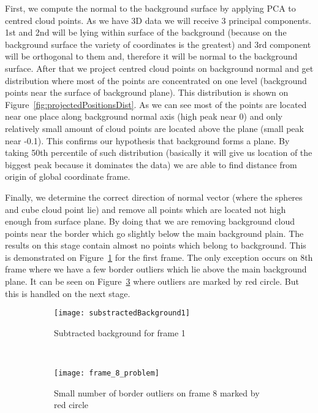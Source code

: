 \documentclass[a4paper,11pt]{article}
\theoremstyle{mytheor}
\begin{document}
First, we compute the normal to the background surface by applying PCA to centred cloud points. As we have 3D data we will receive 3 principal components. 1st and 2nd will be lying within surface of the background (because on the background surface the variety of coordinates is the greatest) and 3rd component will be orthogonal to them and, therefore it will be normal to the background surface. After that we project centred cloud points on background normal and get distribution where most of the points are concentrated on one level (background points near the surface of background plane). This distribution is shown on Figure~\ref{fig:projectedPositionsDist}. As we can see most of the points are located near one place along background normal axis (high peak near 0) and only relatively small amount of cloud points are located above the plane (small peak near -0.1). This confirms our hypothesis that background forms a plane. By taking 50th percentile of such distribution (basically it will give us location of the biggest peak because it dominates the data) we are able to find distance from origin of global coordinate frame.

Finally, we determine the correct direction of normal vector (where the spheres and cube cloud point lie) and remove all points which are located not high enough from surface plane. By doing that we are removing background cloud points near the border which go slightly below the main background plain. The results on this stage contain almost no points which belong to background. This is demonstrated on Figure~\ref{fig:substractedBackground1} for the first frame. The only exception occurs on 8th frame where we have  a few border outliers which lie above the main background plane. It can be seen on Figure~\ref{fig:frame_8_problem} where outliers are marked by red circle. But this is handled on the next stage.

\begin{figure}[htbp!]
    \centering
    \begin{subfigure}[t]{0.45\textwidth}
        \centering
        \texttt{[image: substractedBackground1]}
        \caption{Subtracted background for frame 1}
        \label{fig:substractedBackground1}
    \end{subfigure}%
    ~ 
    \centering
    \begin{subfigure}[t]{0.45\textwidth}
        \centering
        \texttt{[image: frame\_8\_problem]}
        \caption{Small number of border outliers on frame 8 marked by red circle}
        \label{fig:frame_8_problem}
    \end{subfigure}
    \caption{}
\end{figure}
\end{document}
